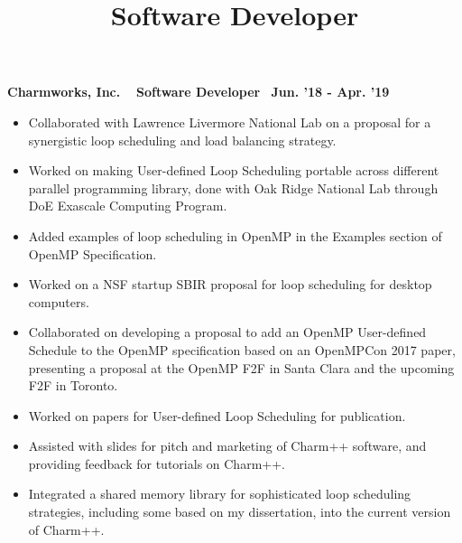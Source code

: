 \title{Software Developer}
\textbf{Charmworks, Inc. $\>$$\>$$\>$$\>$Software Developer$\>$$\>$$\>$$\>$Jun. '18 - Apr. '19}
\vspace{0.0in}
\begin{itemize}
\item Collaborated with Lawrence Livermore National Lab on a proposal for a synergistic loop scheduling and load balancing strategy. 
\item Worked on making User-defined Loop Scheduling portable across different parallel programming library, done with Oak Ridge National Lab through DoE Exascale Computing Program. 
\item Added examples of loop scheduling in OpenMP in the Examples section of OpenMP Specification.
\item Worked on a NSF startup SBIR proposal for loop scheduling for desktop computers. 
\item Collaborated on developing a proposal to add an OpenMP User-defined Schedule to the OpenMP specification based on an OpenMPCon 2017 paper, presenting a proposal at the OpenMP F2F in Santa Clara and the upcoming F2F in Toronto.
\item Worked on papers for User-defined Loop Scheduling for publication.
\item Assisted with slides for pitch and marketing of Charm++ software, and providing feedback for tutorials on Charm++.
\item Integrated a shared memory library for sophisticated loop scheduling strategies, including some based on my dissertation, into the current version of Charm++.
\end{itemize}

